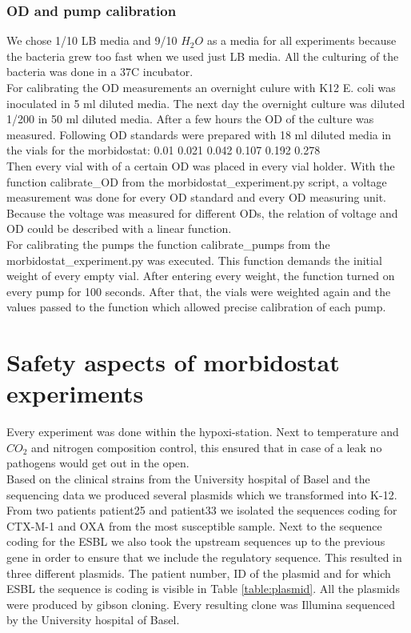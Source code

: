 \subsubsection{OD and pump calibration}
We chose 1/10 LB media and 9/10 $H_2O$ as a media for all experiments because the bacteria grew too fast when we used just LB media. All the culturing of the bacteria was done in a 37\degree C incubator. \\
For calibrating the OD measurements an overnight culure with K12 E. coli was inoculated in 5 ml diluted media. The next day the overnight culture was diluted 1/200 in 50 ml diluted media. After a few hours the OD of the culture was measured. Following OD standards were prepared with 18 ml diluted media in the vials for the morbidostat: 0.01 0.021 0.042 0.107 0.192 0.278\\
Then every vial with of a certain OD was placed in every vial holder. With the function calibrate\_OD from the morbidostat\_experiment.py script, a voltage measurement was done for every OD standard and every OD measuring unit. Because the voltage was measured for different ODs, the relation of voltage and OD could be described with a linear function. \\
For calibrating the pumps the function calibrate\_pumps from the morbidostat\_experiment.py was executed. This function demands the initial weight of every empty vial. After entering every weight, the function turned on every pump for 100 seconds. After that, the vials were weighted again and the values passed to the function which allowed precise calibration of each pump.
\label{section:OD_calibration}

\section{Safety aspects of morbidostat experiments}
Every experiment was done within the hypoxi-station. Next to temperature and $CO_2$ and nitrogen composition control, this ensured that in case of a leak no pathogens would get out in the open. \\
Based on the clinical strains from the University hospital of Basel and the sequencing data we produced several plasmids which we transformed into K-12. From two patients patient25 and patient33 we isolated the sequences coding for CTX-M-1 and OXA from the most susceptible sample. Next to the sequence coding for the ESBL we also took the upstream sequences up to the previous gene in order to ensure that we include the regulatory sequence. This resulted in three different plasmids. The patient number, ID of the plasmid and for which ESBL the sequence is coding is visible in Table \ref{table:plasmid}. All the plasmids were produced by gibson cloning. Every resulting clone was Illumina sequenced by the University hospital of Basel.

